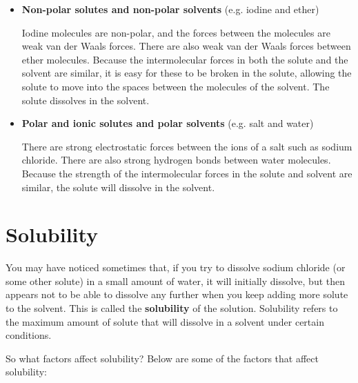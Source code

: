 \begin{itemize}
\item{\textbf{Non-polar solutes and non-polar solvents} (e.g.\@{} iodine and ether)

Iodine molecules are non-polar, and the forces between the molecules are weak van der Waals forces. There are also weak van der Waals forces between ether molecules. Because the intermolecular forces in both the solute and the solvent are similar, it is easy for these to be broken in the solute, allowing the solute to move into the spaces between the molecules of the solvent. The solute dissolves in the solvent.\\}

\item{\textbf{Polar and ionic solutes and polar solvents} (e.g.\@{} salt and water})

There are strong electrostatic forces between the ions of a salt such as sodium chloride. There are also strong hydrogen bonds between water molecules. Because the strength of the intermolecular forces in the solute and solvent are similar, the solute will dissolve in the solvent.
\end{itemize}

\section{Solubility}
\label{sec:soln:solubility}

You may have noticed sometimes that, if you try to dissolve sodium chloride (or some other solute) in a small amount of water, it will initially dissolve, but then appears not to be able to dissolve any further when you keep adding more solute to the solvent. This is called the \textbf{solubility} of the solution. Solubility refers to the maximum amount of solute that will dissolve in a solvent under certain conditions.


So what factors affect solubility? Below are some of the factors that affect solubility:

